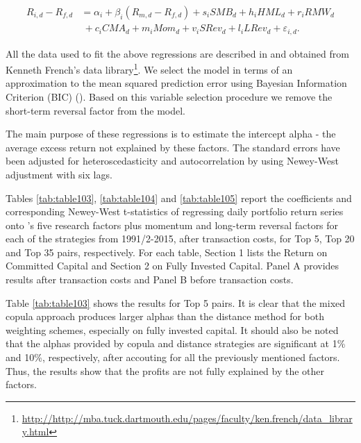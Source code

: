 \documentclass[a4paper,12pt]{report}
\begin{document}
\begin{refsection}
	\begin{equation}
	\begin{aligned}
	R_{i,d}-R_{f,d}&=\alpha _{i}+\beta _{i}\left( R_{m,d}-R_{f,d}\right)+s_{i}SMB_{d}+h_{i}HML_{d}+r_{i}RMW_{d}\\
	&~+c_{i}CMA_{d}+m_{i}Mom_{d}+v_{i}SRev_{d}+l_{i}LRev_{d}+\varepsilon _{i,d}.
	\end{aligned}
	\label{eq:eq101}
	\end{equation}
	
	All the data used to fit the above regressions are described in and obtained from Kenneth French’s data library\footnote{\url{http://http://mba.tuck.dartmouth.edu/pages/faculty/ken.french/data_library.html}}. We select the model in terms of an approximation to the mean squared prediction error using Bayesian Information Criterion (BIC) (\citet*{Schwarz1978}). Based on this variable selection procedure we remove the short-term reversal factor from the model. 
	
	The main purpose of these regressions is to estimate the intercept alpha - the average excess return not explained by these factors. The standard errors have been adjusted for heteroscedasticity and autocorrelation by using Newey-West adjustment with six lags.
	
	Tables \ref{tab:table103}, \ref{tab:table104} and \ref{tab:table105} report the coefficients and corresponding Newey-West t-statistics of regressing daily portfolio return series onto \citet*{ff15}'s five research factors plus momentum and long-term reversal factors for each of the strategies from 1991/2-2015, after transaction costs, for Top 5, Top 20 and Top 35 pairs, respectively. For each table, Section 1 lists the Return on Committed Capital and Section 2 on Fully Invested Capital. Panel A provides results after transaction costs and Panel B before transaction costs.
	
	Table \ref{tab:table103} shows the results for Top 5 pairs. It is clear that the mixed copula approach produces larger alphas than the distance method for both weighting schemes, especially on fully invested capital. It should also be noted that the alphas provided by copula and distance strategies are significant at 1\% and 10\%, respectively, after accouting for all the previously mentioned factors. Thus, the results show that the profits are not fully explained by the other factors.
	

\end{refsection}
\end{document}
